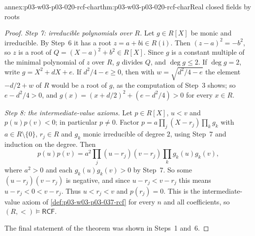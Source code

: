 \begin{annexitem}{annex:p03-w03-p03-020-rcf-char}{thm:p03-w03-p03-020-rcf-char}{Real closed fields by roots}
\begin{proof}
\emph{Step 7: irreducible polynomials over \(R\).} Let \(g\in R[X]\) be
monic and irreducible. By Step~6 it has a root \(z=a+b\mathrm i\in
R(\mathrm i)\). Then \((z-a)^2=-b^2\), so \(z\) is a root of
\(Q=(X-a)^2+b^2\in R[X]\). Since \(g\) is a constant multiple of the
minimal polynomial of \(z\) over \(R\), \(g\) divides \(Q\), and
\(\deg g\le2\). If \(\deg g=2\), write \(g=X^2+dX+e\). If
\(d^2/4-e\ge0\), then with \(w=\sqrt{d^2/4-e}\) the element \(-d/2+w\) of
\(R\) would be a root of \(g\), as the computation of Step~3 shows; so
\(e-d^2/4>0\), and \(g(x)=(x+d/2)^2+(e-d^2/4)>0\) for every \(x\in R\).

\emph{Step 8: the intermediate-value axioms.} Let \(p\in R[X]\),
\(u<v\) and \(p(u)p(v)<0\); in particular \(p\ne0\). Factor
\(p=a\prod_j(X-r_j)\prod_kg_k\) with \(a\in R\setminus\{0\}\), \(r_j\in R\)
and \(g_k\) monic irreducible of degree \(2\), using Step~7 and induction
on the degree. Then
\[
p(u)p(v)=a^2\prod_j(u-r_j)(v-r_j)\prod_kg_k(u)g_k(v),
\]
where \(a^2>0\) and each \(g_k(u)g_k(v)>0\) by Step~7. So some
\((u-r_j)(v-r_j)\) is negative, and since \(u-r_j<v-r_j\) this means
\(u-r_j<0<v-r_j\). Thus \(u<r_j<v\) and \(p(r_j)=0\). This is the
intermediate-value axiom of \cref{def:p03-w03-p03-037-rcf} for every \(n\)
and all coefficients, so \((R,<)\models\mathsf{RCF}\).

The final statement of the theorem was shown in Steps~1 and~6.
\end{proof}
\end{annexitem}

